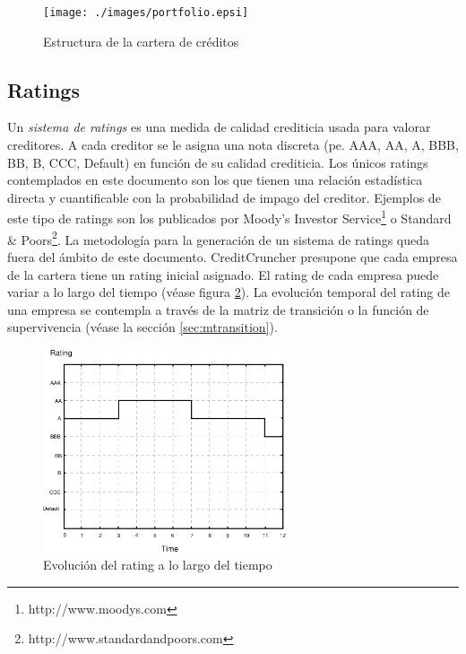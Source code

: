 \begin{figure}[!hb]
\begin{center}
\texttt{[image: ./images/portfolio.epsi]}
\caption{Estructura de la cartera de cr\'editos}
\label{portfolio}
\end{center}
\end{figure}


\subsection{Ratings}

Un \emph{sistema de ratings} es una medida de calidad
crediticia usada para valorar creditores. A cada creditor se le asigna una nota
discreta (pe. AAA, AA, A, BBB, BB, B, CCC, Default) en funci\'on de su calidad
crediticia. Los \'unicos ratings contemplados en este documento 
son los que tienen una relaci\'on estad\'istica directa y cuantificable 
con la probabilidad de impago del creditor. Ejemplos de este tipo de ratings 
son los publicados por Moody's Investor Service\footnote{http://www.moodys.com} 
o Standard \& Poors\footnote{http://www.standardandpoors.com}. 
\newline
\newline
La metodolog\'ia para la generaci\'on de un sistema de ratings queda fuera del
\'ambito de este documento. CreditCruncher presupone que cada empresa de la 
cartera tiene un rating inicial asignado.
\newline
\newline
El rating de cada empresa puede variar a lo largo del tiempo (v\'ease figura
\ref{ratingevol}). La evoluci\'on temporal del rating de una empresa se
contempla a trav\'es de la matriz de transici\'on o la funci\'on de 
supervivencia (v\'ease la secci\'on \ref{sec:mtransition}).
\begin{figure}[!hb]
\begin{center}
\includegraphics[height=6cm, angle=0]{./images/ratingevol.eps}
\caption{Evoluci\'on del rating a lo largo del tiempo}
\label{ratingevol}
\end{center}
\end{figure}

